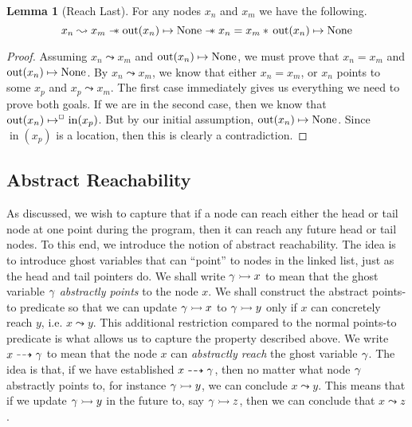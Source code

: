 \documentclass[a4paper, 10pt]{report}
\theoremstyle{definition}
\newtheorem{lemma}[theorem]{Lemma}
\newcommand{\nIn}[1]{\operatorname{in}(#1)}
\newcommand{\nOut}[1]{\operatorname{out}(#1)}
\newcommand{\node}{x}
\newcommand{\nodeM}[1]{\node_{#1}}
\newcommand{\reach}[2]{#1 \leadsto #2}
\newcommand{\ar}[2]{#1 \dashrightarrow #2}
\newcommand{\ap}[2]{#1 \rightarrowtail #2}
\begin{document}
\begin{lemma}[Reach Last]\label{lemma:reach-last}
  For any nodes $\nodeM{n}$ and $\nodeM{m}$ we have the following.
  \begin{equation*}
    \reach{\nodeM{n}}{\nodeM{m}} \wand \nOut{\nodeM{n}} \mapsto \None \wand \nodeM{n} = \nodeM{m} \star{} \nOut{\nodeM{n}} \mapsto \None
  \end{equation*}
\end{lemma}
\begin{proof}
  Assuming $\reach{\nodeM{n}}{\nodeM{m}}$ and $\nOut{\nodeM{n}} \mapsto \None$, we must prove that $\nodeM{n} = \nodeM{m}$ and $\nOut{\nodeM{n}} \mapsto \None$.
  By $\reach{\nodeM{n}}{\nodeM{m}}$, we know that either $\nodeM{n} = \nodeM{m}$, or $\nodeM{n}$ points to some $\nodeM{p}$ and $\reach{\nodeM{p}}{\nodeM{m}}$. The first case immediately gives us everything we need to prove both goals. If we are in the second case, then we know that $\nOut{\nodeM{n}} \mapsto^{\persistently} \nIn{\nodeM{p}}$. But by our initial assumption, $\nOut{\nodeM{n}} \mapsto \None$. Since $\nIn{\nodeM{p}}$ is a location, then this is clearly a contradiction.
\end{proof}


\subsection{Abstract Reachability}

As discussed, we wish to capture that if a node can reach either the head or tail node at one point during the program, then it can reach any future head or tail nodes. To this end, we introduce the notion of abstract reachability. The idea is to introduce ghost variables that can ``point'' to nodes in the linked list, just as the head and tail pointers do. We shall write $\ap{\gname}{x}$ to mean that the ghost variable $\gamma$ \emph{abstractly points} to the node $x$. We shall construct the abstract points-to predicate so that we can update $\ap{\gname}{x}$ to $\ap{\gname}{y}$ only if $x$ can concretely reach $y$, i.e. $\reach{x}{y}$. This additional restriction compared to the normal points-to predicate is what allows us to capture the property described above. We write $\ar{x}{\gname}$ to mean that the node $x$ can \emph{abstractly reach} the ghost variable $\gamma$. The idea is that, if we have established $\ar{x}{\gname}$, then no matter what node $\gamma$ abstractly points to, for instance $\ap{\gname}{y}$, we can conclude $\reach{x}{y}$. This means that if we update $\ap{\gname}{y}$ in the future to, say $\ap{\gname}{z}$, then we can conclude that $\reach{x}{z}$.
\end{document}

